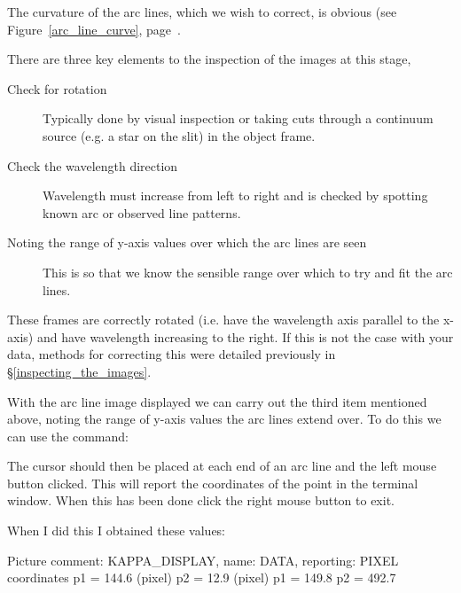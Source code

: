 \documentclass[twoside,11pt]{starlink}
\providecommand{\scspec}[2]{#1}
\begin{document}
The curvature of the arc lines, which we wish to correct, is obvious
(see \scspec{Figure~\ref{arc_line_curve},
page~\pageref{arc_line_curve}}{the previous figure}.

There are three key elements to the inspection of the images at this stage,

\begin{description}

\item [Check for rotation]
      Typically done by visual inspection or taking cuts through a
      continuum source (e.g. a star on the slit) in the object frame.

\item [Check the wavelength direction]
      Wavelength must increase from left to right and is checked by
      spotting known arc or observed line patterns.

\item [Noting the range of y-axis values over which the arc lines are seen]
      This is so that we know the sensible range over which to try and fit the arc lines.

\end{description}


These frames are correctly rotated (i.e. have the wavelength axis
parallel to the x-axis) and have wavelength increasing to the right.
If this is not the case with your data, methods for correcting this
were detailed previously in \scspec{\S\ref{inspecting_the_images}}
{\htmlref{Inspecting the Image}{inspecting_the_images}}.

With the arc line image displayed we can carry out the third item
mentioned above, noting the range of y-axis values the arc lines
extend over. To do this we can use the 
 command:


{
\scspec{\small}{ }
\begin{terminalv}
\end{terminalv}
}

The cursor should then be placed at each end of an arc line and the
left mouse button clicked. This will report the coordinates of the
point in the terminal window. When this has been done click the right
mouse button to exit.

When I did this I obtained these values:

{
\scspec{\small}{ }
\begin{terminalv}
Picture comment: KAPPA_DISPLAY, name: DATA, reporting: PIXEL coordinates
 p1 = 144.6 (pixel)   p2 = 12.9 (pixel)
 p1 = 149.8           p2 = 492.7
\end{terminalv}
}
\end{document}
